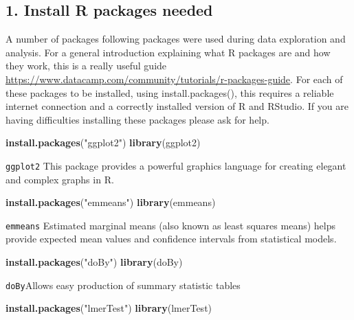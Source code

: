 \documentclass[]{book}
\newenvironment{Shaded}{\begin{snugshade}}{\end{snugshade}}
\newcommand{\KeywordTok}[1]{\textcolor[rgb]{0.13,0.29,0.53}{\textbf{#1}}}
\newcommand{\StringTok}[1]{\textcolor[rgb]{0.31,0.60,0.02}{#1}}
\newcommand{\NormalTok}[1]{#1}
\theoremstyle{definition}
\theoremstyle{definition}
\theoremstyle{definition}
\theoremstyle{remark}
\begin{document}
\subsection{1. Install R packages
needed}\label{install-r-packages-needed}

A number of packages following packages were used during data
exploration and analysis. For a general introduction explaining what R
packages are and how they work, this is a really useful guide
\url{https://www.datacamp.com/community/tutorials/r-packages-guide}. For
each of these packages to be installed, using install.packages(), this
requires a reliable internet connection and a correctly installed
version of R and RStudio. If you are having difficulties installing
these packages please ask for help.

\begin{Shaded}
\begin{Highlighting}[]
\KeywordTok{install.packages}\NormalTok{(}\StringTok{"ggplot2"}\NormalTok{)}
\KeywordTok{library}\NormalTok{(ggplot2)}
\end{Highlighting}
\end{Shaded}

\texttt{ggplot2} This package provides a powerful graphics language for
creating elegant and complex graphs in R.

\begin{Shaded}
\begin{Highlighting}[]
\KeywordTok{install.packages}\NormalTok{(}\StringTok{"emmeans"}\NormalTok{)}
\KeywordTok{library}\NormalTok{(emmeans)}
\end{Highlighting}
\end{Shaded}

\texttt{emmeans} Estimated marginal means (also known as least squares
means) helps provide expected mean values and confidence intervals from
statistical models.

\begin{Shaded}
\begin{Highlighting}[]
\KeywordTok{install.packages}\NormalTok{(}\StringTok{"doBy"}\NormalTok{)}
\KeywordTok{library}\NormalTok{(doBy)}
\end{Highlighting}
\end{Shaded}

\texttt{doBy}Allows easy production of summary statistic tables

\begin{Shaded}
\begin{Highlighting}[]
\KeywordTok{install.packages}\NormalTok{(}\StringTok{"lmerTest"}\NormalTok{)}
\KeywordTok{library}\NormalTok{(lmerTest)}
\end{Highlighting}
\end{Shaded}
\end{document}
